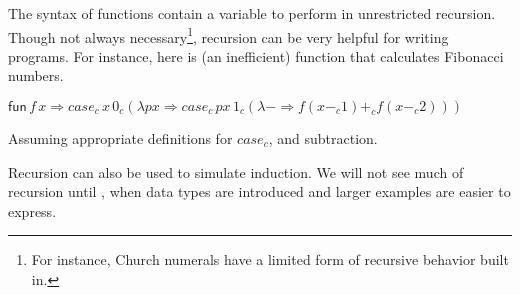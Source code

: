 The syntax of functions contain a variable to perform in unrestricted recursion.
Though not always necessary\footnote{
  For instance, Church numerals have a limited form of recursive behavior built in.
}, recursion can be very helpful for writing programs.
For instance, here is (an inefficient) function that calculates Fibonacci numbers.

$\mathsf{fun}\,f\,x\Rightarrow case_{c}\,x\,0_{c}\left(\lambda px\Rightarrow case_{c}\,px\,1_{c}\left(\lambda-\Rightarrow f\left(x-_{c}1\right)+_{c}f\left(x-_{c}2\right)\right)\right)$

Assuming appropriate definitions for $case_{c}$, and subtraction.

Recursion can also be used to simulate induction. 
We will not see much of recursion until , when data types are introduced and larger examples are easier to express.
